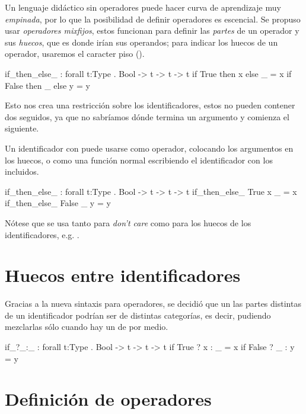 \begin{blueleft}
Un lenguaje didáctico sin operadores puede hacer curva de aprendizaje muy \emph{empinada}, por lo que la posibilidad de definir operadores es escencial. Se propuso usar \emph{operadores mixfijos}, estos funcionan para definir las \emph{partes} de un operador y sus \emph{huecos}, que es donde irían sus operandos; para indicar los huecos de un operador, usaremos el caracter piso (\inlinecode{\_}).

\begin{anglercode}
if_then_else_ : forall t:Type . Bool -> t -> t -> t
if True  then x else _ = x
if False then _ else y = y
\end{anglercode}

Esto nos crea una restricción sobre los identificadores, estos no pueden contener dos \inlinecode{\_} seguidos, ya que no sabríamos dónde termina un argumento y comienza el siguiente.

Un identificador con \inlinecode{\_} puede usarse como operador, colocando los argumentos en los huecos, o como una función normal escribiendo el identificador con los \inlinecode{\_} incluidos.

\begin{anglercode}
if_then_else_ : forall t:Type . Bool -> t -> t -> t
if_then_else_ True  x _ = x
if_then_else_ False _ y = y
\end{anglercode}

Nótese que se usa \inlinecode{\_} tanto para \emph{don't care} como para los huecos de los identificadores, e.g. .
\end{blueleft}

\section{Huecos entre identificadores}

\begin{blueleft}
Gracias a la nueva sintaxis para operadores, se decidió que un las partes distintas de un identificador podrían ser de distintas categorías, es decir, pudiendo mezclarlas sólo cuando hay un \inlinecode{\_} de por medio.

\begin{anglercode}
if_?_:_ : forall t:Type . Bool -> t -> t -> t
if True  ? x : _ = x
if False ? _ : y = y
\end{anglercode}
\end{blueleft}

\section{Definición de operadores}

